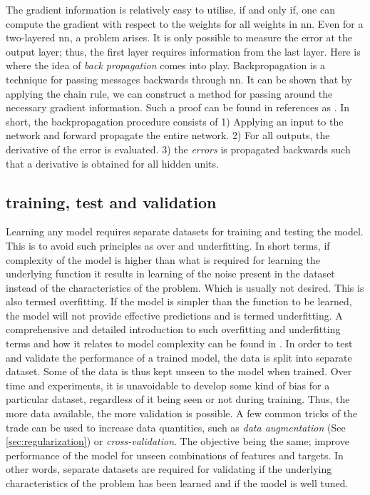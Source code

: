The gradient information is relatively easy to utilise, if and only if, one can compute the gradient with respect to the weights for all weights in \gls{nn}. Even for a two-layered \gls{nn}, a problem arises. It is only possible to measure the error at the output layer; thus, the first layer requires information from the last layer. Here is where the idea of \emph{back propagation} comes into play. Backpropagation is a technique for passing messages backwards through \gls{nn}. It can be shown that by applying the chain rule, we can construct a method for passing around the necessary gradient information. Such a proof can be found in references as \cite{Nielsen2015, M.Bishop2006}. In short, the backpropagation procedure consists of 1) Applying an input to the network and forward propagate the entire network. 2) For all outputs, the derivative of the error is evaluated. 3) the \emph{errors} is propagated backwards such that a derivative is obtained for all hidden units. 
 



\subsection{ training, test and validation}
Learning any model requires separate datasets for training and testing the model. This is to avoid such principles as over and underfitting. In short terms, if complexity of the model is higher than what is required for learning the underlying function it results in learning of the noise present in the dataset instead of the characteristics of the problem. Which is usually not desired. This is also termed overfitting. If the model is simpler than the function to be learned, the model will not provide effective predictions and is termed underfitting. A comprehensive and detailed introduction to such overfitting and underfitting terms and how it relates to model complexity can be found in \cite{M.Bishop2006}. In order to test and validate the performance of a trained model, the data is split into separate dataset. Some of the data is thus kept unseen to the model when trained. Over time and experiments, it is unavoidable to develop some kind of bias for a particular dataset, regardless of it being seen or not during training. Thus, the more data available, the more validation is possible. A few common tricks of the trade can be used to increase data quantities, such as \emph{data augmentation} (See \ref{sec:regularization}) or \emph{cross-validation}. The objective being the same; improve performance of the model for unseen combinations of features and targets. In other words, separate datasets are required for validating if the underlying characteristics of the problem has been learned and if the model is well tuned.

